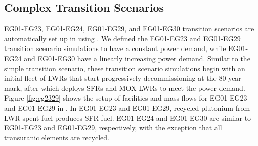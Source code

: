 \pagebreak 
\subsection{Complex Transition Scenarios}
\label{sec:complex}
EG01-EG23, EG01-EG24, EG01-EG29, and EG01-EG30 transition scenarios
are automatically set up in \Cyclus using \deploy. 
We defined the EG01-EG23 and EG01-EG29 transition scenario simulations to have a constant 
power demand, while EG01-EG24 and EG01-EG30 have a linearly increasing power demand. 
Similar to the simple transition scenario, these transition scenario 
simulations begin with an initial fleet of \glspl{LWR} 
that start progressively decommissioning at the 80-year mark, 
after which \deploy deploys \glspl{SFR} and \gls{MOX} \glspl{LWR} to meet 
the power demand. 
Figure \ref{fig:eg2329}
shows the setup of facilities and mass flows for 
EG01-EG23 and EG01-EG29 in \Cyclus. 
In EG01-EG23 and EG01-EG29, recycled plutonium from LWR spent fuel 
produces  \gls{SFR} fuel. 
EG01-EG24 and EG01-EG30 are similar to EG01-EG23 and EG01-EG29, respectively, 
with the exception that all transuranic elements are recycled.

